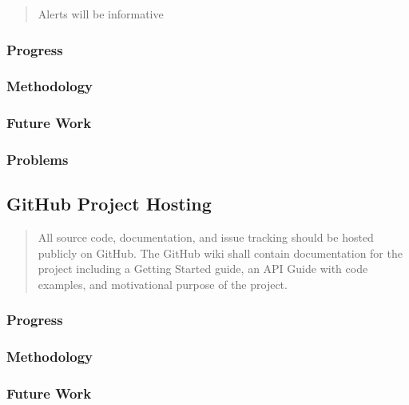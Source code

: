 \documentclass[draftclsnofoot,onecolumn]{IEEEtran}
\begin{document}
\begin{quote}

Alerts will be informative

\end{quote}

\subsubsection{Progress}

\subsubsection{Methodology}

\subsubsection{Future Work}

\subsubsection{Problems}






\subsection{GitHub Project Hosting}

\begin{quote}

All source code, documentation, and issue tracking should be hosted publicly on GitHub. The GitHub wiki shall contain documentation for the project including a Getting Started guide, an API Guide with code examples, and motivational purpose of the project.

\end{quote}

\subsubsection{Progress}

\subsubsection{Methodology}

\subsubsection{Future Work}
\end{document}
